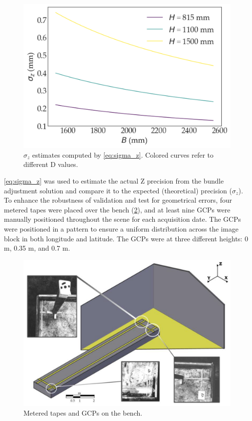 \documentclass[12pt,a4paper,oneside]{report}
\begin{document}
\begin{figure}[H]
    \centering
    \includegraphics[width=\textwidth]{Images/agronomy-14-00306-g004}
    \caption{$\sigma_z$ estimates computed by \cref{eq:sigma_z}. Colored curves refer to different D values.}
    \label{fig:base_effect}
\end{figure}

\cref{eq:sigma_z} was used to estimate the actual Z precision from the bundle adjustment solution and compare it to the expected (theoretical) precision
($\sigma_z$).
To enhance the robustness of validation and test for geometrical errors, four metered tapes were placed over the bench
(\cref{fig:Geometric_calibration}), and at least nine GCPs were manually positioned throughout the scene for each acquisition date. The GCPs were positioned in a pattern to ensure a uniform distribution across the image block in both longitude and latitude. The GCPs were at three different heights: 0 m, 0.35 m, and 0.7 m.

\begin{figure}[H]
    \centering
    \includegraphics[width=\textwidth]{Images/agronomy-14-00306-g005}
    \caption{Metered tapes and GCPs on the bench.}
    \label{fig:Geometric_calibration}
\end{figure}
\end{document}
